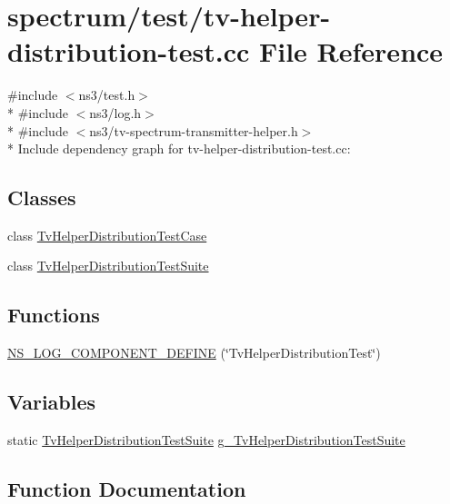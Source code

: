 \hypertarget{tv-helper-distribution-test_8cc}{}\section{spectrum/test/tv-\/helper-\/distribution-\/test.cc File Reference}
\label{tv-helper-distribution-test_8cc}
{\ttfamily \#include $<$ns3/test.\+h$>$}\\*
{\ttfamily \#include $<$ns3/log.\+h$>$}\\*
{\ttfamily \#include $<$ns3/tv-\/spectrum-\/transmitter-\/helper.\+h$>$}\\*
Include dependency graph for tv-\/helper-\/distribution-\/test.cc\+:
\subsection*{Classes}
\begin{DoxyCompactItemize}
\item 
class \hyperlink{classTvHelperDistributionTestCase}{Tv\+Helper\+Distribution\+Test\+Case}
\item 
class \hyperlink{classTvHelperDistributionTestSuite}{Tv\+Helper\+Distribution\+Test\+Suite}
\end{DoxyCompactItemize}
\subsection*{Functions}
\begin{DoxyCompactItemize}
\item 
\hyperlink{tv-helper-distribution-test_8cc_ac737c8555e72915b5a47c1ea845239b3}{N\+S\+\_\+\+L\+O\+G\+\_\+\+C\+O\+M\+P\+O\+N\+E\+N\+T\+\_\+\+D\+E\+F\+I\+NE} (\char`\"{}Tv\+Helper\+Distribution\+Test\char`\"{})
\end{DoxyCompactItemize}
\subsection*{Variables}
\begin{DoxyCompactItemize}
\item 
static \hyperlink{classTvHelperDistributionTestSuite}{Tv\+Helper\+Distribution\+Test\+Suite} \hyperlink{tv-helper-distribution-test_8cc_a0887488cb99b30b15f755102fa32c479}{g\+\_\+\+Tv\+Helper\+Distribution\+Test\+Suite}
\end{DoxyCompactItemize}


\subsection{Function Documentation}

